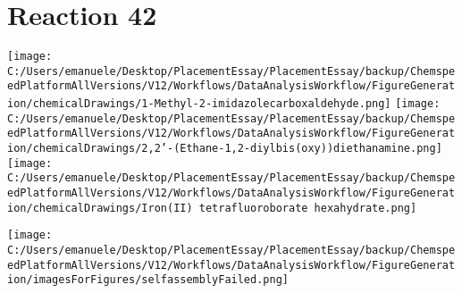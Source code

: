 \documentclass{article}%
\begin{document}
\section*{Reaction 42}%
%
\begin{scheme}[H]%
\begin{minipage}{0.5\textwidth}%
\texttt{[image: C:/Users/emanuele/Desktop/PlacementEssay/PlacementEssay/backup/ChemspeedPlatformAllVersions/V12/Workflows/DataAnalysisWorkflow/FigureGeneration/chemicalDrawings/1-Methyl-2-imidazolecarboxaldehyde.png]}%
\texttt{[image: C:/Users/emanuele/Desktop/PlacementEssay/PlacementEssay/backup/ChemspeedPlatformAllVersions/V12/Workflows/DataAnalysisWorkflow/FigureGeneration/chemicalDrawings/2,2'-(Ethane-1,2-diylbis(oxy))diethanamine.png]}%
\texttt{[image: C:/Users/emanuele/Desktop/PlacementEssay/PlacementEssay/backup/ChemspeedPlatformAllVersions/V12/Workflows/DataAnalysisWorkflow/FigureGeneration/chemicalDrawings/Iron(II) tetrafluoroborate hexahydrate.png]}%
\end{minipage}%
\begin{minipage}{0.5\textwidth}%
\begin{center}%
\texttt{[image: C:/Users/emanuele/Desktop/PlacementEssay/PlacementEssay/backup/ChemspeedPlatformAllVersions/V12/Workflows/DataAnalysisWorkflow/FigureGeneration/imagesForFigures/selfassemblyFailed.png]}%
\end{center}%
\end{minipage}%
\caption{Self-assembly of components 12, 19, with Iron(II) in a 3.0:1.5:1.0 molar ratio in CH$_3$CN at 60\textdegree C for 40h. These are the reagents (starting materials) for reaction 42.}%
\end{scheme}%
\end{document}
